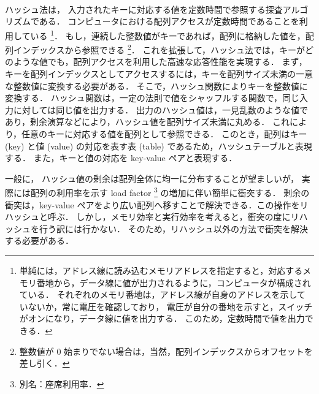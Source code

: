 \thispagestyle{empty} %

　\\
\\
\\
\\
\\
\\
\\
\\

ハッシュ法は，
入力されたキーに対応する値を定数時間で参照する探査アルゴリズムである．
コンピュータにおける配列アクセスが定数時間であることを利用している
\footnote{
単純には，アドレス線に読み込むメモリアドレスを指定すると，対応するメモリ番地から，データ線に値が出力されるように，コンピュータが構成されている．
それぞれのメモリ番地は，アドレス線が自身のアドレスを示していないか，常に電圧を確認しており，
電圧が自分の番地を示すと，スイッチがオンになり，データ線に値を出力する．
このため，定数時間で値を出力できる．
}．
もし，連続した整数値がキーであれば，配列に格納した値を，配列インデックスから参照できる
\footnote{
整数値が 0 始まりでない場合は，当然，配列インデックスからオフセットを差し引く．
}．
これを拡張して，ハッシュ法では，キーがどのような値でも，配列アクセスを利用した高速な応答性能を実現する．
まず，キーを配列インデックスとしてアクセスするには，キーを配列サイズ未満の一意な整数値に変換する必要がある．
そこで，ハッシュ関数によりキーを整数値に変換する．
ハッシュ関数は，一定の法則で値をシャッフルする関数で，同じ入力に対しては同じ値を出力する．
出力のハッシュ値は，一見乱数のような値であり，剰余演算などにより，ハッシュ値を配列サイズ未満に丸める．
これにより，任意のキーに対応する値を配列として参照できる．
このとき，配列はキー (key) と値 (value) の対応を表す表 (table) であるため，ハッシュテーブルと表現する．
また，キーと値の対応を key-value ペアと表現する．

一般に，
ハッシュ値の剰余は配列全体に均一に分布することが望ましいが，
実際には配列の利用率を示す load factor \footnote{別名：座席利用率．} の増加に伴い簡単に衝突する．
剰余の衝突は，key-value ペアをより広い配列へ移すことで解決できる．この操作をリハッシュと呼ぶ．
しかし，メモリ効率と実行効率を考えると，衝突の度にリハッシュを行う訳には行かない．
そのため，リハッシュ以外の方法で衝突を解決する必要がある．

